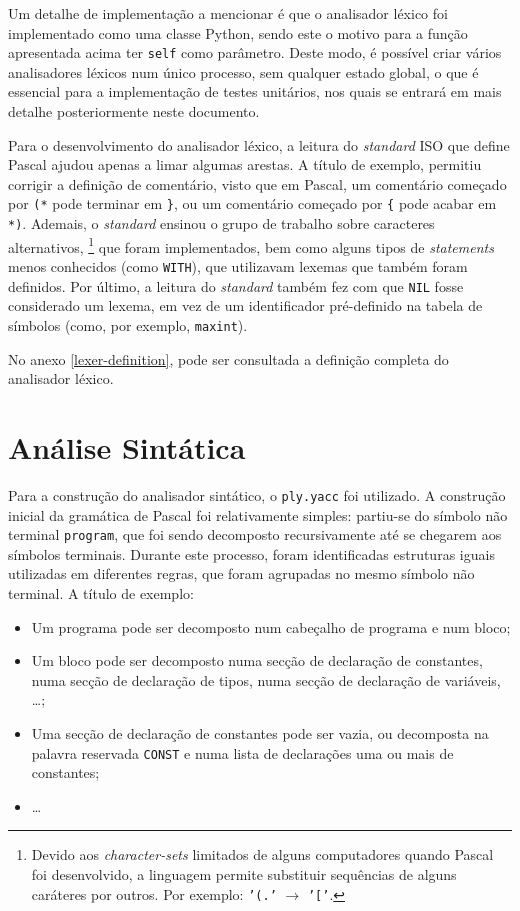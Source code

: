 \documentclass[12pt, a4paper]{article}
\begin{document}
Um detalhe de implementação a mencionar é que o analisador léxico foi implementado como uma classe
Python, sendo este o motivo para a função apresentada acima ter \texttt{self} como parâmetro. Deste
modo, é possível criar vários analisadores léxicos num único processo, sem qualquer estado global, o
que é essencial para a implementação de testes unitários, nos quais se entrará em mais detalhe
posteriormente neste documento.

Para o desenvolvimento do analisador léxico, a leitura do \emph{standard} ISO que define Pascal
ajudou apenas a limar algumas arestas. A título de exemplo, permitiu corrigir a definição de
comentário, visto que em Pascal, um comentário começado por \texttt{(*} pode terminar em
\texttt{\}}, ou um comentário começado por \texttt{\{} pode acabar em \texttt{*)}. Ademais, o
\emph{standard} ensinou o grupo de trabalho sobre caracteres alternativos,
\footnote{
    Devido aos \emph{character-sets} limitados de alguns computadores quando Pascal foi
    desenvolvido, a linguagem permite substituir sequências de alguns caráteres por outros. Por
    exemplo: \texttt{'(.'} $\rightarrow$ \texttt{'['}.
}
que foram implementados, bem como alguns tipos de
\emph{statements} menos conhecidos (como \texttt{WITH}), que utilizavam lexemas que também foram
definidos. Por último, a leitura do \emph{standard} também fez com que \texttt{NIL} fosse
considerado um lexema, em vez de um identificador pré-definido na tabela de símbolos (como, por
exemplo, \texttt{maxint}).

No anexo \ref{lexer-definition}, pode ser consultada a definição completa do analisador léxico.

\section{Análise Sintática}

Para a construção do analisador sintático, o \texttt{ply.yacc} \cite{ply} foi utilizado. A
construção inicial da gramática de Pascal foi relativamente simples: partiu-se do símbolo não
terminal \texttt{program}, que foi sendo decomposto recursivamente até se chegarem aos símbolos
terminais. Durante este processo, foram identificadas estruturas iguais utilizadas em diferentes
regras, que foram agrupadas no mesmo símbolo não terminal. A título de exemplo:

\begin{itemize}
    \item Um programa pode ser decomposto num cabeçalho de programa e num bloco;
    \item Um bloco pode ser decomposto numa secção de declaração de constantes, numa secção de
        declaração de tipos, numa secção de declaração de variáveis, \ldots;
    \item Uma secção de declaração de constantes pode ser vazia, ou decomposta na palavra reservada
        \texttt{CONST} e numa lista de declarações uma ou mais de constantes;
    \item \ldots
\end{itemize}
\end{document}
